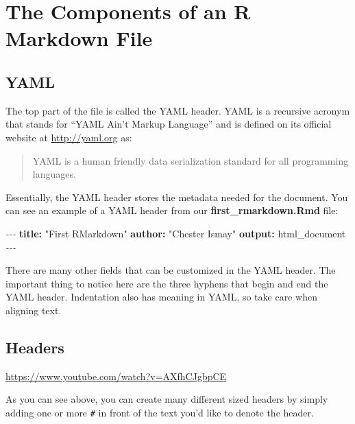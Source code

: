 \documentclass[]{tufte-book}
\newenvironment{Shaded}{\begin{snugshade}}{\end{snugshade}}
\newcommand{\AttributeTok}[1]{\textcolor[rgb]{0.13,0.29,0.53}{#1}}
\newcommand{\FunctionTok}[1]{\textcolor[rgb]{0.13,0.29,0.53}{\textbf{#1}}}
\newcommand{\KeywordTok}[1]{\textcolor[rgb]{0.13,0.29,0.53}{\textbf{#1}}}
\newcommand{\PreprocessorTok}[1]{\textcolor[rgb]{0.56,0.35,0.01}{\textit{#1}}}
\newcommand{\StringTok}[1]{\textcolor[rgb]{0.31,0.60,0.02}{#1}}
\begin{document}
\section{The Components of an R Markdown File}\label{the-components-of-an-r-markdown-file}

\subsection{YAML}\label{yaml}

The top part of the file is called the YAML header. YAML is a recursive acronym that stands for ``YAML Ain't Markup Language'' and is defined on its official website at \url{http://yaml.org} as:

\begin{quote}
YAML is a human friendly data serialization
standard for all programming languages.
\end{quote}

Essentially, the YAML header stores the metadata needed for the document. You can see an example of a YAML header from our \textbf{first\_rmarkdown.Rmd} file:

\begin{Shaded}
\begin{Highlighting}[]
\PreprocessorTok{{-}{-}{-}}
\FunctionTok{title}\KeywordTok{:}\AttributeTok{ }\StringTok{"First RMarkdown"}
\FunctionTok{author}\KeywordTok{:}\AttributeTok{ }\StringTok{"Chester Ismay"}
\FunctionTok{output}\KeywordTok{:}\AttributeTok{ html\_document}
\PreprocessorTok{{-}{-}{-}}
\end{Highlighting}
\end{Shaded}

There are many other fields that can be customized in the YAML header. The important thing to notice here are the three hyphens that begin and end the YAML header. Indentation also has meaning in YAML, so take care when aligning text.

\subsection{Headers}\label{headers}

\vspace{0.1in}\begin{center}\footnotesize{\url{https://www.youtube.com/watch?v=AXfhCJgbpCE}}\end{center}\vspace{0.1in}

As you can see above, you can create many different sized headers by simply adding one or more \texttt{\#} in front of the text you'd like to denote the header.
\end{document}
